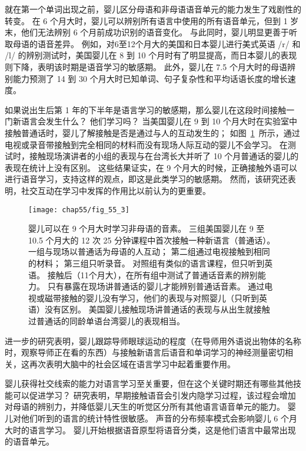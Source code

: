 就在第一个单词出现之前，婴儿区分母语和非母语语音单元的能力发生了戏剧性的转变。
在 6 个月大时，婴儿可以辨别所有语言中使用的所有语音单元，但到 1 岁末，他们无法辨别 6 个月前成功识别的语音变化。
与此同时，婴儿明显更善于听取母语的语音差异。
例如，对6至12个月大的美国和日本婴儿进行美式英语 /r/ 和 /l/ 的辨别测试时，美国婴儿在 8 到 10 个月时有了明显提高，而日本婴儿的表现则下降，表明该时期是语音学习的敏感期。
此外，婴儿在 7.5 个月大时的母语辨别能力预测了 14 到 30 个月大时已知单词、句子复杂性和平均话语长度的增长速度。


如果说出生后第 1 年的下半年是语言学习的敏感期，那么婴儿在这段时间接触一门新语言会发生什么？
他们学习吗？
当美国婴儿在 9 到 10 个月大时在实验室中接触普通话时，婴儿了解接触是否是通过与人的互动发生的；
如图~\ref{fig:55_3}~所示，通过电视或录音带接触到完全相同的材料而没有现场人际互动的婴儿不会学习。
在测试时，接触现场演讲者的小组的表现与在台湾长大并听了 10 个月普通话的婴儿的表现在统计上没有区别。
这些结果证实，在 9 个月大的时候，正确接触外语可以进行语音学习，支持这样的观点，即这是此类学习的敏感期。
然而，该研究还表明，社交互动在学习中发挥的作用比以前认为的更重要。


\begin{figure}[htbp]
	\centering
	\texttt{[image: chap55/fig\_55\_3]}
	\caption{婴儿可以在 9 个月大时学习非母语的音素。
		三组美国婴儿在 9 至 10.5 个月大的 12 次 25 分钟课程中首次接触一种新语言（普通话）。
		一组与现场以普通话为母语的人互动；
		第二组通过电视接触到相同的材料；
		第三组只听录音。
		对照组有类似的语言课程，但只听到英语。
		接触后（11个月大），在所有组中测试了普通话音素的辨别能力\cite{kuhl2003foreign}。
		只有暴露在现场讲普通话的婴儿才能辨别普通话音素。
		通过电视或磁带接触的婴儿没有学习，他们的表现与对照婴儿（只听到英语）没有区别。
		美国婴儿接触现场讲普通话的表现与从出生就接触过普通话的同龄单语台湾婴儿的表现相当。}
	\label{fig:55_3}
\end{figure}


进一步的研究表明，婴儿跟踪导师眼球运动的程度（在导师用外语说出物体的名称时，观察导师正在看的东西）与接触新语言后语音和单词学习的神经测量密切相关，这再次表明大脑中的社会区域在语言学习中起着重要作用。


婴儿获得社交线索的能力对语言学习至关重要，但在这个关键时期还有哪些其他技能可以促进学习？
研究表明，早期接触语音会引发内隐学习过程，该过程会增加对母语的辨别力，并降低婴儿天生的听觉区分所有其他语言语音单元的能力。
婴儿对他们听到的语言的统计特性很敏感。
声音的分布频率模式会影响婴儿 6 个月大时的语言学习。
婴儿开始根据语音原型将语音分类，这是他们语言中最常出现的语音单元。


